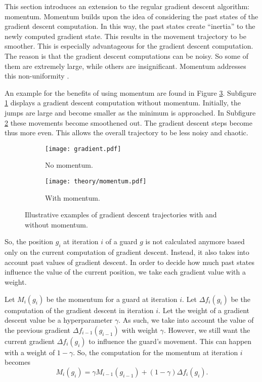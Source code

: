 This section introduces an extension to the regular gradient descent algorithm: momentum. 
Momentum builds upon the idea of considering the past states of the gradient descent computation. In this way, the past states create ``inertia'' to the newly computed gradient state. This results in the movement trajectory to be smoother. 
This is especially advantageous for the gradient descent computation. The reason is that the gradient descent computations can be noisy. So some of them are extremely large, while others are insignificant. Momentum addresses this non-uniformity \cite{goodfelow2016deep}.

An example for the benefits of using momentum are found in Figure \ref{fig:momentums}. Subfigure \ref{fig:theory_no_momentum} displays a gradient descent computation without momentum. Initially, the jumps are large and become smaller as the minimum is approached. In Subfigure \ref{fig:theory_momentum} these movements become smoothened out. The gradient descent steps become thus more even. This allows the overall trajectory to be less noisy and chaotic.

\begin{figure}[!h]
    \centering
    \begin{subfigure}{0.45\textwidth}
        \texttt{[image: gradient.pdf]}
        \caption{No momentum.}
        \label{fig:theory_no_momentum}
    \end{subfigure}
    \hfill
    \begin{subfigure}{0.45\textwidth}
        \texttt{[image: theory/momentum.pdf]}
        \caption{With momentum.}
        \label{fig:theory_momentum}
    \end{subfigure}
    \caption{Illustrative examples of gradient descent trajectories with and without momentum.}
    \label{fig:momentums}
\end{figure}

So, the position $g_i$ at iteration $i$ of a guard $g$ is not calculated anymore based only on the current computation of gradient descent. Instead, it also takes into account past values of gradient descent. In order to decide how much past states influence the value of the current position, we  take each gradient value with a weight.

Let $M_i(g_i)$ be the momentum for a guard at iteration $i$. Let $\Delta f_i(g_i)$ be the computation of the gradient descent in iteration $i$. Let the weight of a gradient descent value be a hyperparameter $\gamma$. 
As such, we  take into account the value of the previous gradient $\Delta f_{i - 1}(g_{i - 1})$ with weight $\gamma$. However, we still want the current gradient $\Delta f_i(g_i)$ to influence the guard's movement. This can happen with a weight of $1 - \gamma$. So, the computation for the momentum at iteration $i$ becomes $$M_i(g_i) = \gamma M_{i - 1}(g_{i - 1}) + (1 - \gamma)\Delta f_i(g_i).$$

